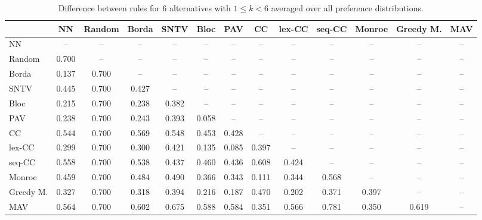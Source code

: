 
\begin{table*}[h!]
\centering
\begin{tabular}{lcccccccccccc}
\toprule
 & NN & Random & Borda & SNTV & Bloc & PAV & CC & lex-CC & seq-CC & Monroe & Greedy M. & MAV \\
\midrule
NN & -- & -- & -- & -- & -- & -- & -- & -- & -- & -- & -- & -- \\
Random & 0.700 & -- & -- & -- & -- & -- & -- & -- & -- & -- & -- & -- \\
Borda & 0.137 & 0.700 & -- & -- & -- & -- & -- & -- & -- & -- & -- & -- \\
SNTV & 0.445 & 0.700 & 0.427 & -- & -- & -- & -- & -- & -- & -- & -- & -- \\
Bloc & 0.215 & 0.700 & 0.238 & 0.382 & -- & -- & -- & -- & -- & -- & -- & -- \\
PAV & 0.238 & 0.700 & 0.243 & 0.393 & 0.058 & -- & -- & -- & -- & -- & -- & -- \\
CC & 0.544 & 0.700 & 0.569 & 0.548 & 0.453 & 0.428 & -- & -- & -- & -- & -- & -- \\
lex-CC & 0.299 & 0.700 & 0.300 & 0.421 & 0.135 & 0.085 & 0.397 & -- & -- & -- & -- & -- \\
seq-CC & 0.558 & 0.700 & 0.538 & 0.437 & 0.460 & 0.436 & 0.608 & 0.424 & -- & -- & -- & -- \\
Monroe & 0.459 & 0.700 & 0.484 & 0.490 & 0.366 & 0.343 & 0.111 & 0.344 & 0.568 & -- & -- & -- \\
Greedy M. & 0.327 & 0.700 & 0.318 & 0.394 & 0.216 & 0.187 & 0.470 & 0.202 & 0.371 & 0.397 & -- & -- \\
MAV & 0.564 & 0.700 & 0.602 & 0.675 & 0.588 & 0.584 & 0.351 & 0.566 & 0.781 & 0.350 & 0.619 & -- \\
\bottomrule
\end{tabular}

\caption{Difference between rules for 6 alternatives with $1 \leq k < 6$ averaged over all preference distributions.}
\end{table*}
